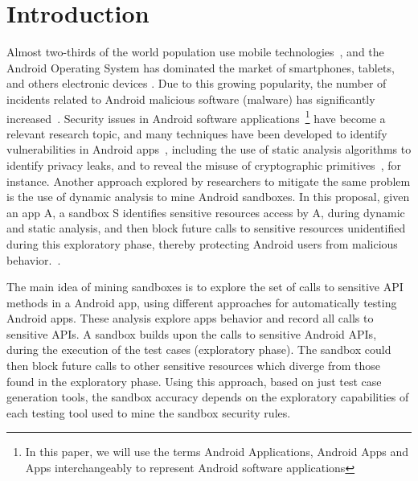 \section{Introduction}\label{sec:introduction}

Almost two-thirds of the world population use mobile technologies~\cite{Comscore}, and the Android Operating System has dominated the market of smartphones, tablets, and others electronic devices \cite{statcounter}. Due to this growing popularity, the number of incidents related to Android malicious software (malware) has significantly increased~\cite{DBLP:journals/comsur/FarukiBLGGCR15,DBLP:journals/csur/SufatrioTCT15}. Security issues in Android software applications~\footnote{In this paper, we will use the terms Android Applications, Android Apps and Apps interchangeably to represent Android software applications} have become a relevant research topic, and many techniques have been developed to identify vulnerabilities in Android apps~\cite{DBLP:conf/pldi/ArztRFBBKTOM14}, including the use of static analysis algorithms to identify privacy leaks, and to reveal the misuse of cryptographic primitives~\cite{krueger:ecoop-2018,rahaman:ccs-2019}, for instance. Another approach explored by researchers to mitigate the same problem is the use of dynamic analysis to mine Android sandboxes. In this proposal, given an app A, a sandbox S identifies sensitive resources access by A, during dynamic and static analysis, and then block future calls to sensitive resources unidentified during this exploratory phase, thereby protecting Android users from malicious behavior.~\cite{DBLP:conf/icse/JamrozikSZ16}.

The main idea of mining sandboxes is to explore the set of calls to sensitive API methods in a Android app, using different approaches for automatically testing Android apps. These analysis explore apps behavior and record all calls to sensitive APIs. A sandbox builds upon the calls to sensitive Android APIs, during the execution of the test cases (exploratory phase). The sandbox could then block future calls to other sensitive resources which diverge from those found in the exploratory phase. Using this approach, based on just test case generation tools, the sandbox accuracy depends on the exploratory capabilities of each testing tool used to mine the sandbox security rules.
  
